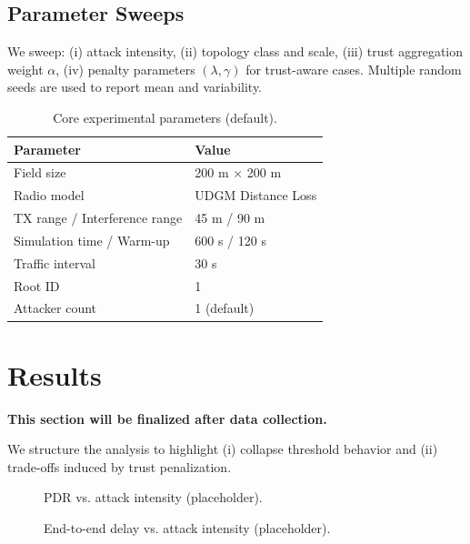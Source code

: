 \documentclass[11pt,a4paper]{article}
\begin{document}
\subsection{Parameter Sweeps}
We sweep:
(i) attack intensity,
(ii) topology class and scale,
(iii) trust aggregation weight $\alpha$,
(iv) penalty parameters $(\lambda,\gamma)$ for trust-aware cases.
Multiple random seeds are used to report mean and variability.

\begin{table}[t]
\centering
\caption{Core experimental parameters (default).}
\label{tab:params}
\begin{tabular}{ll}
\toprule
Parameter & Value \\
\midrule
Field size & 200 m $\times$ 200 m \\
Radio model & UDGM Distance Loss \\
TX range / Interference range & 45 m / 90 m \\
Simulation time / Warm-up & 600 s / 120 s \\
Traffic interval & 30 s \\
Root ID & 1 \\
Attacker count & 1 (default) \\
\bottomrule
\end{tabular}
\end{table}

\section{Results}
\label{sec:results}

\noindent\textbf{This section will be finalized after data collection.}

We structure the analysis to highlight (i) collapse threshold behavior and (ii) trade-offs induced by trust penalization.

\begin{figure}[t]
  \centering
  \caption{PDR vs. attack intensity (placeholder).}
  \label{fig:pdr}
\end{figure}

\begin{figure}[t]
  \centering
  \caption{End-to-end delay vs. attack intensity (placeholder).}
  \label{fig:delay}
\end{figure}
\end{document}

